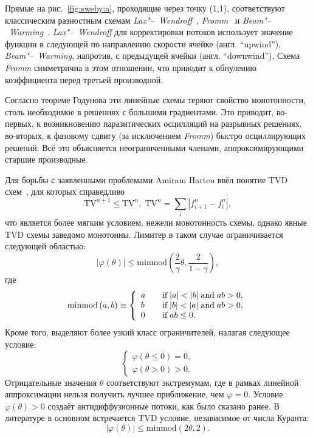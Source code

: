 \documentclass[a4paper,10pt]{article}
\newcommand{\TV}{\mathrm{TV}}
\begin{document}
Прямые на рис.~\ref{fig:sweby:a}, проходящие через точку (1,1), соответствуют классическим разностным схемам
\textit{Lax"--~Wendroff}~\cite{Lax1960}, \textit{Fromm}~\cite{Fromm1968} и \textit{Beam"--~Warming}~\cite{Warming1975}.
\textit{Lax"--~Wendroff} для корректировки потоков использует значение функции в следующей по направлению скорости ячейке
(англ. ``upwind''), \textit{Beam"--~Warming}, напротив, с предыдущей ячейки (англ. ``downwind''). Схема \textit{Fromm} симметрична в этом отношении,
что приводит к обнулению коэффициента перед третьей производной.

Согласно теореме Годунова эти линейные схемы теряют свойство монотонности, столь необходимое в решениях с большими градиентами.
Это приводит, во-первых, к возникновению паразитических осцилляций на разрывных решениях,
во-вторых, к фазовому сдвигу (за исключением \textit{Fromm}) быстро осциллирующих решений.
Всё это объясняется неограниченными членами, аппроксимирующими старшие производные.

Для борьбы с заявленными проблемами Amiram Harten ввёл понятие TVD схем~\cite{Harten1983}, для которых справедливо
\[ \TV^{n+1}\le \TV^n, \; \TV^n = \sum_i| f_{i+1}^n - f_i^n |, \]
что является более мягким условием, нежели монотонность схемы, однако явные TVD схемы заведомо монотонны.
Лимитер в таком случае ограничивается следующей областью:
\[ \left|\varphi(\theta)\right| \leq \mathrm{minmod}\left(\frac2{\gamma}\theta,\frac2{1-\gamma}\right), \] где
\[
\mathrm{minmod}\,(a,b) \equiv \left\{
\begin{array}{l l}
	a & \quad \text{if}\;|a|<|b| \;\text{and}\;ab>0, \\
	b & \quad \text{if}\;|b|<|a| \;\text{and}\;ab>0, \\
	0 & \quad \text{if}\;ab \leq 0.
\end{array}\right.
\]
Кроме того, выделяют более узкий класс ограничителей, налагая следующее условие:
\[ \left\{
\begin{array}{l}
	\varphi(\theta\le0)=0, \\
	\varphi(\theta>0) > 0.
\end{array}\right.
\]
Отрицательные значения \(\theta\) соответствуют экстремумам, где в рамках линейной аппроксимации нельзя получить лучшее приближение, чем \(\varphi=0\).
Условие \(\varphi(\theta)>0\) создаёт антидиффузионные потоки, как было сказано ранее.
В литературе в основном встречается TVD условие, независимое от числа Куранта:
\[ \left|\varphi(\theta)\right| \leq \mathrm{minmod}(2\theta,2). \]
\end{document}
